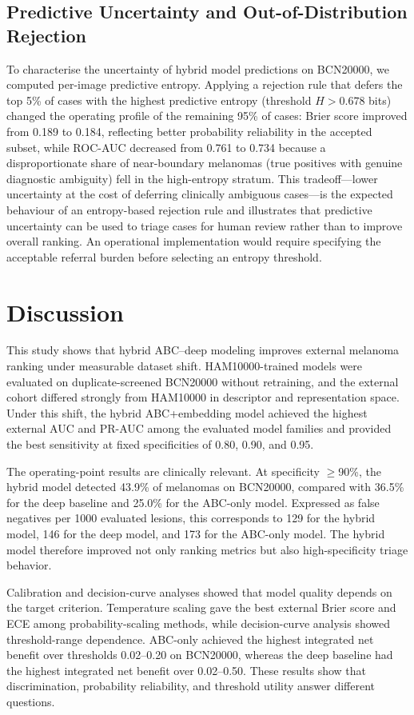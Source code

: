\documentclass[preprint,12pt]{elsarticle}
\begin{document}
\subsection{Predictive Uncertainty and Out-of-Distribution Rejection}
To characterise the uncertainty of hybrid model predictions on BCN20000, we computed per-image predictive entropy. Applying a rejection rule that defers the top 5\% of cases with the highest predictive entropy (threshold $H > 0.678$ bits) changed the operating profile of the remaining 95\% of cases: Brier score improved from 0.189 to 0.184, reflecting better probability reliability in the accepted subset, while ROC-AUC decreased from 0.761 to 0.734 because a disproportionate share of near-boundary melanomas (true positives with genuine diagnostic ambiguity) fell in the high-entropy stratum. This tradeoff---lower uncertainty at the cost of deferring clinically ambiguous cases---is the expected behaviour of an entropy-based rejection rule and illustrates that predictive uncertainty can be used to triage cases for human review rather than to improve overall ranking. An operational implementation would require specifying the acceptable referral burden before selecting an entropy threshold.

\section{Discussion}

This study shows that hybrid ABC--deep modeling improves external melanoma ranking under measurable dataset shift. HAM10000-trained models were evaluated on duplicate-screened BCN20000 without retraining, and the external cohort differed strongly from HAM10000 in descriptor and representation space. Under this shift, the hybrid ABC+embedding model achieved the highest external AUC and PR-AUC among the evaluated model families and provided the best sensitivity at fixed specificities of 0.80, 0.90, and 0.95.

The operating-point results are clinically relevant. At specificity $\geq$90\%, the hybrid model detected 43.9\% of melanomas on BCN20000, compared with 36.5\% for the deep baseline and 25.0\% for the ABC-only model. Expressed as false negatives per 1000 evaluated lesions, this corresponds to 129 for the hybrid model, 146 for the deep model, and 173 for the ABC-only model. The hybrid model therefore improved not only ranking metrics but also high-specificity triage behavior.

Calibration and decision-curve analyses showed that model quality depends on the target criterion. Temperature scaling gave the best external Brier score and ECE among probability-scaling methods, while decision-curve analysis showed threshold-range dependence. ABC-only achieved the highest integrated net benefit over thresholds 0.02--0.20 on BCN20000, whereas the deep baseline had the highest integrated net benefit over 0.02--0.50. These results show that discrimination, probability reliability, and threshold utility answer different questions.
\end{document}
